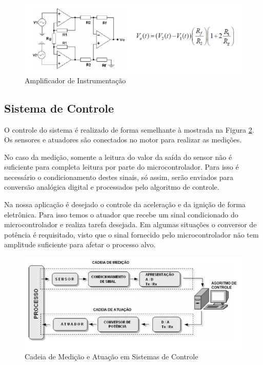 \begin{figure}[h!]
	\centering
	\includegraphics[keepaspectratio=true,scale= 0.7]{figuras/Amplificador.PNG}
	\caption{Amplificador de Instrumentação \cite{SMAR}}
	\label{amplificadorDeInstrumentacao}
\end{figure}

\subsection{Sistema de Controle}

O controle do sistema é realizado de forma semelhante à mostrada na Figura \ref{CadeiaDeMedicao}. Os sensores e atuadores são conectados no motor para realizar as medições. 

No caso da medição, somente a leitura do valor da saída do sensor não é suficiente para completa leitura por parte do microcontrolador. Para isso é necessário o condicionamento destes sinais, só assim, serão enviados para conversão analógica digital e processados pelo algoritmo de controle.

Na nossa aplicação é desejado o controle da aceleração e da ignição de forma eletrônica. Para isso temos o atuador que recebe um sinal condicionado do microcontrolador e realiza tarefa desejada. Em algumas situações o conversor de potência é requisitado, visto que o sinal fornecido pelo microcontrolador não tem amplitude suficiente para afetar o processo alvo.

\begin{figure}[h!]
	\centering
	\includegraphics[keepaspectratio=true,scale= 0.9]{figuras/CadeiaDeMedicao.PNG}
	\caption{Cadeia de Medição e Atuação em Sistemas de Controle \cite{SMAR}}
	\label{CadeiaDeMedicao}
\end{figure}

